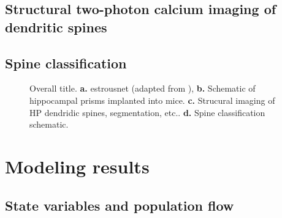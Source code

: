 \documentclass[11pt,letterpaper, onecolumn]{exam}
\begin{document}
\subsection{Structural two-photon calcium imaging of dendritic spines}
\subsection{Spine classification}

\begin{figure}[h]
    \centering
    \caption{Overall title. \textbf{a.} estrousnet (adapted from \cite{estrousnet}), \textbf{b.} Schematic of hippocampal prisms implanted into mice. \textbf{c.} Strucural imaging of HP dendridic spines, segmentation, etc.. \textbf{d.} Spine classification schematic.}
    \label{fig:intro}
\end{figure}

\section{Modeling results}

\subsection{State variables and population flow}
\end{document}
